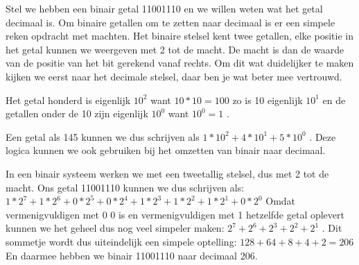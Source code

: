 Stel we hebben een binair getal 11001110 en we willen weten wat het getal decimaal is. Om binaire getallen om te zetten naar decimaal is er een simpele reken opdracht met machten. Het binaire stelsel kent twee getallen, elke positie in het getal kunnen we weergeven met 2 tot de macht. De macht is dan de waarde van de positie van het bit gerekend vanaf rechts. Om dit wat duidelijker te maken kijken we eerst naar het decimale stelsel, daar ben je wat beter mee vertrouwd.

Het getal honderd is eigenlijk
\begin{math}
	10^2
\end{math}
want
\begin{math}
	10*10=100
\end{math}
zo is 10 eigenlijk
\begin{math}
	10^1
\end{math}
en de getallen onder de 10 zijn eigenlijk
\begin{math}
	10^0
\end{math}
want
\begin{math}
	10^0=1
\end{math}
.

Een getal als 145 kunnen we dus schrijven als
\begin{math}
	1*10^2 + 4*10^1 + 5*10^0
\end{math}
. Deze logica kunnen we ook gebruiken bij het omzetten van binair naar decimaal.


In een binair systeem werken we met een tweetallig stelsel, dus met 2 tot de macht. Ons getal 11001110 kunnen we dus schrijven als:
\begin{math}
	1*2^7 + 1*2^6 + 0*2^5 + 0*2^4 + 1*2^3 + 1*2^2 + 1*2^1 + 0*2^0
\end{math}
Omdat vermenigvuldigen met 0 0 is en vermenigvuldigen met 1 hetzelfde getal oplevert kunnen we het geheel dus nog veel simpeler maken:
\begin{math}
	2^7 + 2^6 + 2^3 + 2^2 + 2^1
\end{math}
. Dit sommetje wordt dus uiteindelijk een simpele optelling:
\begin{math}
	128 + 64 + 8 + 4 + 2 = 206
\end{math}
En daarmee hebben we binair 11001110 naar decimaal 206.

